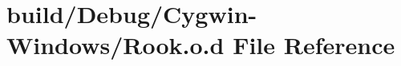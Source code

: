 \hypertarget{_cygwin-_windows_2_rook_8o_8d}{}\section{build/\+Debug/\+Cygwin-\/\+Windows/\+Rook.o.\+d File Reference}
\label{_cygwin-_windows_2_rook_8o_8d}
